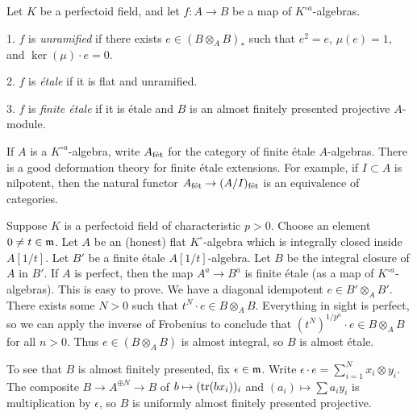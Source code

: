 \documentclass{article}
\begin{document}
Let $K$ be a perfectoid field, and let $f:A\to B$ be a map of 
$K^{\circ a}$-algebras. 

\begin{definition}
1. $f$ is \emph{unramified} if there exists $e\in (B\otimes_A B)_\ast$ such 
that $e^2=e$, $\mu(e)=1$, and $\ker(\mu)\cdot e=0$. 

2. $f$ is \emph{\'etale} if it is flat and unramified. 

3. $f$ is \emph{finite \'etale} if it is \'etale and $B$ is an almost finitely 
presented projective $A$-module. 
\end{definition}

If $A$ is a $K^{\circ a}$-algebra, write $A_{\textnormal{f\'et}}$ for the category of finite 
\'etale $A$-algebras. There is a good deformation theory for finite \'etale 
extensions. For example, if $I\subset A$ is nilpotent, then the natural functor 
$A_{\textnormal{f\'et}} \to (A/I)_{\textnormal{f\'et}}$ is an equivalence of categories. 

Suppose $K$ is a perfectoid field of characteristic $p>0$. Choose an element 
$0\ne t\in\mathfrak{m}$. Let $A$ be an (honest) flat $K^\circ$-algebra which is integrally 
closed inside $A[1/t]$. Let $B'$ be a finite \'etale $A[1/t]$-algebra. Let $B$ 
be the integral closure of $A$ in $B'$. If $A$ is perfect, then the map 
$A^a \to B^a$ is finite \'etale (as a map of $K^{\circ a}$-algebras). This is easy 
to prove. We have a diagonal idempotent $e\in B'\otimes_A B'$. There exists 
some $N>0$ such that $t^N\cdot e\in B\otimes_A B$. Everything in sight is 
perfect, so we can apply the inverse of Frobenius to conclude that 
$(t^N)^{1/p^n}\cdot e\in B\otimes_A B$ for all $n>0$. Thus  
$e\in (B\otimes_A B)$ is almost integral, so $B$ is almost \'etale. 

To see that $B$ is almost finitely presented, fix $\epsilon\in\mathfrak{m}$. Write 
$\epsilon\cdot e = \sum_{i=1}^N x_i\otimes y_i$. The composite 
$B\to A^{\oplus N} \to B$ of $b\mapsto (\operatorname{tr}(b x_i))_i$ and 
$(a_i)\mapsto \sum a_i y_i$ is multiplication by $\epsilon$, so $B$ is uniformly almost 
finitely presented projective. 







\end{document}
